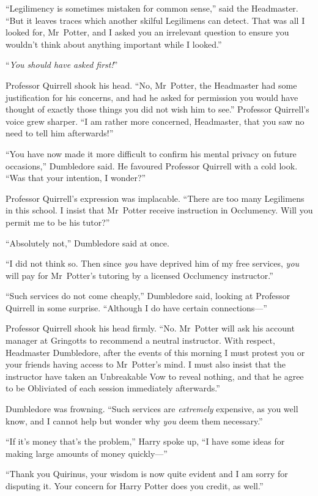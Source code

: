 “Legilimency is sometimes mistaken for common sense,” said the Headmaster.
“But it leaves traces which another skilful Legilimens can detect. That was all I looked for, Mr~Potter, and I asked you an irrelevant question to ensure you wouldn’t think about anything important while I looked.”

“\emph{You should have asked first!}”

Professor Quirrell shook his head.
“No, Mr~Potter, the Headmaster had some justification for his concerns, and had he asked for permission you would have thought of exactly those things you did not wish him to see.” Professor Quirrell’s voice grew sharper.
“I am rather more concerned, Headmaster, that you saw no need to tell him afterwards!”

“You have now made it more difficult to confirm his mental privacy on future occasions,” Dumbledore said. He favoured Professor Quirrell with a cold look.
“Was that your intention, I wonder?”

Professor Quirrell’s expression was implacable.
“There are too many Legilimens in this school. I insist that Mr~Potter receive instruction in Occlumency. Will you permit me to be his tutor?”

“Absolutely not,” Dumbledore said at once.

“I did not think so. Then since \emph{you} have deprived him of my free services, \emph{you} will pay for Mr~Potter’s tutoring by a licensed Occlumency instructor.”

“Such services do not come cheaply,” Dumbledore said, looking at Professor Quirrell in some surprise.
“Although I do have certain connections—”

Professor Quirrell shook his head firmly.
“No. Mr~Potter will ask his account manager at Gringotts to recommend a neutral instructor. With respect, Headmaster Dumbledore, after the events of this morning I must protest you or your friends having access to Mr~Potter’s mind. I must also insist that the instructor have taken an Unbreakable Vow to reveal nothing, and that he agree to be Obliviated of each session immediately afterwards.”

Dumbledore was frowning.
“Such services are \emph{extremely} expensive, as you well know, and I cannot help but wonder why \emph{you} deem them necessary.”

“If it’s money that’s the problem,” Harry spoke up,
“I have some ideas for making large amounts of money quickly—”

“Thank you Quirinus, your wisdom is now quite evident and I am sorry for disputing it. Your concern for Harry Potter does you credit, as well.”

